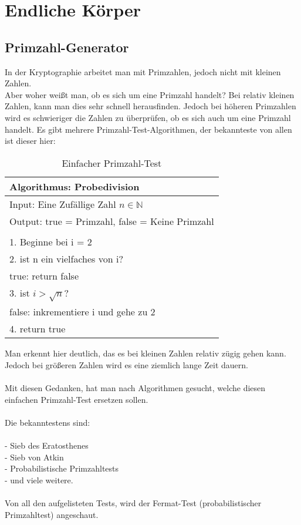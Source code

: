 \chapter{Endliche Körper}

\section{Primzahl-Generator}
In der Kryptographie arbeitet man mit Primzahlen, jedoch nicht mit kleinen Zahlen.\\
Aber woher weißt man, ob es sich um eine Primzahl handelt? Bei relativ kleinen Zahlen, kann man dies sehr schnell herausfinden.
Jedoch bei höheren Primzahlen wird es schwieriger die Zahlen zu überprüfen, ob es sich auch um eine Primzahl handelt.
Es gibt mehrere Primzahl-Test-Algorithmen, der bekannteste von allen ist dieser hier:

\begin{table}[!ht]
    \centering
        \begin{tabular}{l}
            \toprule
            \textbf{Algorithmus: Probedivision}\\
            \midrule
            Input: Eine Zufällige Zahl $n \in \mathbb{N} $\\
            Output: true = Primzahl, false = Keine Primzahl  \\
                                                       \\
                1. Beginne bei i = 2\\
                2. ist n ein vielfaches von i?\\
                    true: return false\\
                3. ist $ i > \sqrt{n}$?\\
                    false: inkrementiere i und gehe zu 2\\
                4. return true\\
           \bottomrule
        \end{tabular}
        \caption{Einfacher Primzahl-Test}
        \label{tab3}
    \end{table}

Man erkennt hier deutlich, das es bei kleinen Zahlen relativ zügig gehen kann.\\
Jedoch bei größeren Zahlen wird es eine ziemlich lange Zeit dauern. \\
\\
Mit diesen Gedanken, hat man nach Algorithmen gesucht, welche diesen einfachen Primzahl-Test ersetzen sollen.\\
\\Die bekanntestens sind:\\
\\
- Sieb des Eratosthenes\\
- Sieb von Atkin\\
- Probabilistische Primzahltests\\
- und viele weitere.\\
\\
Von all den aufgelisteten Tests, wird der Fermat-Test (probabilistischer Primzahltest) angeschaut.\\
\newpage
